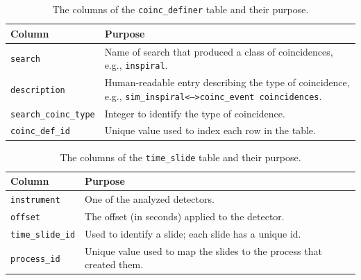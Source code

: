 \begin{table}[p]
\label{tab:coinc_definer}
\center
\begin{tabular}{l | p{10cm}}
Column      &   Purpose     \\
\hline \hline
\texttt{search}     &       Name of search that produced a class of coincidences, e.g., \texttt{inspiral}. \\
\hline
\texttt{description}    &   Human-readable entry describing the type of coincidence, e.g., \texttt{sim\_inspiral<-->coinc\_event coincidences}. \\
\hline
\texttt{search\_coinc\_type}    &   Integer to identify the type of coincidence. \\
\hline
\texttt{coinc\_def\_id}     &   Unique value used to index each row in the table.
\end{tabular}
\caption{The columns of the \texttt{coinc\_definer} table and their purpose.}
\end{table}

\pagebreak

\begin{table}[p]
\label{tab:time_slide}
\center
\begin{tabular}{m{3.5cm} | p{10cm}}
Column      &   Purpose     \\
\hline \hline
\texttt{instrument} &   One of the analyzed detectors. \\
\hline
\texttt{offset}     &   The offset (in seconds) applied to the detector. \\
\hline
\texttt{time\_slide\_id}    &   Used to identify a slide; each slide has a unique id. \\
\hline
\texttt{process\_id}    &   Unique value used to map the slides to the process that created them.
\end{tabular}
\caption{The columns of the \texttt{time\_slide} table and their purpose.}
\end{table}

